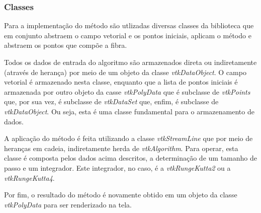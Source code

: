   \subsubsection{Classes}
  \label{classes-vtk}
  Para a implementação do método são utlizadas diversas classes da biblioteca que em conjunto abstraem o campo vetorial e os pontos iniciais, aplicam o método e abstraem os pontos que compõe a fibra.
  
  Todos os dados de entrada do algoritmo são armazenados direta ou indiretamente (através de herança) por meio de um objeto da classe \textit{vtkDataObject}. O campo vetorial é armazenado nesta classe, enquanto que a lista de pontos iniciais é armazenada por outro objeto da casse \textit{vtkPolyData} que é subclasse de \textit{vtkPoints} que, por sua vez, é subclasse de \textit{vtkDataSet} que, enfim, é subclasse de \textit{vtkDataObject}. Ou seja, esta é uma classe fundamental para o armazenamento de dados.
  
  A aplicação do método é feita utilizando a classe \textit{vtkStreamLine} que por meio de heranças em cadeia, indiretamente herda de \textit{vtkAlgorithm}. Para operar, esta classe é composta pelos dados acima descritos, a determinação de um tamanho de passo e um integrador. Este integrador, no caso, é a \textit{vtkRungeKutta2} ou a \textit{vtkRungeKutta4}.
  
  Por fim, o resultado do método é novamente obtido em um objeto da classe \textit{vtkPolyData} para ser renderizado na tela.
